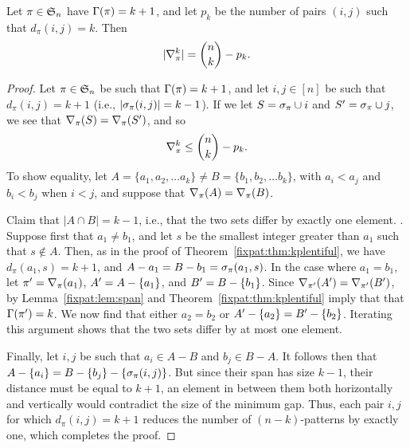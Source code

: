   \begin{theorem} \label{fixpat:thm:gappairs}
    Let $\pi \in \S_{n}$ have $\Gam(\pi) = k + 1$, and let $p_k$ be the number
    of pairs $(i,j)$ such that $d_\pi(i,j) = k$. Then 
    $$ | \delpik | = \binom{n}{k} - p_k.$$
  \end{theorem}
  \begin{proof}
    Let $\pi \in \S_n$ be such that $\Gam(\pi) = k+1$, and let $i,j \in [n]$ be
    such that $d_\pi(i,j) = k+1$ (i.e., $|\pspan_\pi(i,j)| = k-1$). If we let
    $S = \pspan_\pi \cup i$ and $S\p = \pspan_\pi \cup j$, we see that
    $\delpi(S) = \delpi(S\p)$, and so 
    $$\delpik \leq \binom{n}{k} - p_k. $$
    To show equality, let $A = \{a_1, a_2, \dots a_k\} \neq B = \{b_1, b_2,
    \dots b_k\}$, with $a_i < a_j$ and $b_i < b_j$ when $i < j$, and suppose
    that $\delpi(A) = \delpi(B)$. 
    
    Claim that $|A \cap B| = k-1$, i.e., that the two sets differ by exactly
    one element. .  Suppose first that $a_1 \neq b_1$, and let $s$ be the
    smallest integer greater than $a_1$ such that $s \notin A$. Then, as in the
    proof of Theorem~\ref{fixpat:thm:kplentiful}, we have $d_\pi(a_1, s) = k+1$, and
    $A - {a_1} = B - {b_1} = \pspan_\pi(a_1, s)$.  In the case where $a_1 =
    b_1$, let $\pi\p = \delpi(a_1)$, $A\p = A - \{a_1\}$, and $B\p = B -
    \{b_1\}$. Since $\del_{\pi\p} (A\p) = \del_{\pi\p}(B\p)$, by
    Lemma~\ref{fixpat:lem:span} and Theorem~\ref{fixpat:thm:kplentiful} imply that that
    $\Gam(\pi\p) = k$. We now find that either $a_2 = b_2$ or $A\p - \{a_2\} =
    B\p - \{b_2\}$. Iterating this argument shows that the two sets differ by
    at most one element. 

    Finally, let $i,j$ be such that $a_i \in A - B$ and $b_j \in B - A$. It
    follows then that $ A-\{a_i\} = B - \{b_j\} - \{\pspan_\pi(i,j) \}$. But
    since their span has size $k-1$, their distance must be equal to $k+1$,
    an element in between them both horizontally and vertically would
    contradict the size of the minimum gap. Thus, each pair $i,j$ for which
    $d_\pi(i,j) = k+1$ reduces the number of $(n-k)$-patterns by exactly one,
    which completes the proof. 
  \end{proof}





    

      

